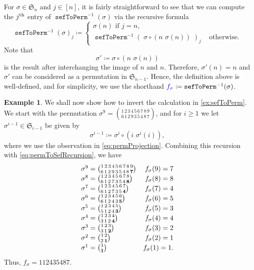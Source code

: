 \documentclass[reqno]{amsart}
\theoremstyle{definition}
\newtheorem{example}[theorem]{Example}
\newcommand{\defin}[1]{%
\relax\ifmmode%
\textcolor{blue}{#1}%
\else\textcolor{blue}{\emph{#1}}%
\fi%
}
\newcommand{\thsup}{\textnormal{th}}
\newcommand{\symS}{\mathfrak{S}}
\DeclareMathOperator{\sefToPerm}{\mathtt{sefToPerm}}
\begin{document}
For $\sigma \in \symS_n$ and $j \in [n]$,
it is fairly straightforward to see that we can compute
the $j^\thsup$ entry of $\sefToPerm^{-1}(\sigma)$
via the recursive formula
\begin{equation}\label{eq:permToSefRecursion}
 \sefToPerm^{-1}(\sigma)_j \coloneqq 
\begin{cases}
 \sigma(n) \text{ if $j=n$,} \\
 \sefToPerm^{-1}( \; \sigma \circ (n\,\,\sigma(n)) \;  )_j &\text{ otherwise}.
\end{cases}
\end{equation}
Note that 
\begin{equation}\label{eq:permProjection}
 \sigma' \coloneqq \sigma \circ (n\,\,\sigma(n))
\end{equation}
is the result after interchanging the image of $n$ and $n$.
Therefore, $\sigma'(n)= n$ and $\sigma'$ can be considered as a permutation in $\symS_{n-1}$.
Hence, the definition above is well-defined, and for simplicity,
we use the shorthand $\defin{f_\sigma} \coloneqq \sefToPerm^{-1}(\sigma)$.

\begin{example}\label{ex:permToSef}
We shall now show how to invert the calculation in \cref{ex:sefToPerm}.
We start with the permutation $\sigma^9=\binom{1\,2\,3\,4\,5\,6\,7\,8\,9}{6\,1\,2\,9\,3\,5\,4\,8\,7}$,
and for $i \geq 1$ we let $\sigma^{i-1} \in \symS_{i-1}$ be given by
\[
  \sigma^{i-1} \coloneqq \sigma^{i} \circ (i\,\,\sigma^i(i)),
\]
where we use the observation in \eqref{eq:permProjection}.
Combining this recursion with \eqref{eq:permToSefRecursion},
we have
\begin{equation*}
\begingroup
\renewcommand*{\arraystretch}{1.2}
\begin{array}{lr}
	\sigma^9=\binom{1\,2\,3\,4\,5\,6\,7\,8\,9}{6\,1\,2\,9\,3\,5\,4\,8\,\mathbf 7}  & f_{\sigma}(9)=7 \\
	\sigma^8=\binom{1\,2\,3\,4\,5\,6\,7\,8}{6\,1\,2\,7\,3\,5\,4\,\mathbf 8 } & f_{\sigma}(8)=8 \\
	\sigma^7=\binom{1\,2\,3\,4\,5\,6\,7}{6\,1\,2\,7\,3\,5\, \mathbf 4} & f_{\sigma}(7)=4 \\
	\sigma^6=\binom{1\,2\,3\,4\,5\,6}{6\,1\,2\,4\,3\,\mathbf  5} & f_{\sigma}(6)=5 \\
	\sigma^5=\binom{1\,2\,3\,4\,5}{5\,1\,2\,4\,\mathbf  3} & f_{\sigma}(5)=3 \\
	\sigma^4=\binom{1\,2\,3\,4}{3\,1\,2\,\mathbf  4} & f_{\sigma}(4)=4 \\
	\sigma^3=\binom{1\,2\,3}{3\,1\,\mathbf  2} & f_{\sigma}(3)=2 \\
	\sigma^2=\binom{1\,2}{2\,\mathbf  1} & f_{\sigma}(2)=1 \\
	\sigma^1=\binom{1}{\mathbf 1} & f_{\sigma}(1)=1.
\end{array}
\endgroup
\end{equation*}
Thus, $f_{\sigma}=112435487$.
\end{example}
\end{document}
